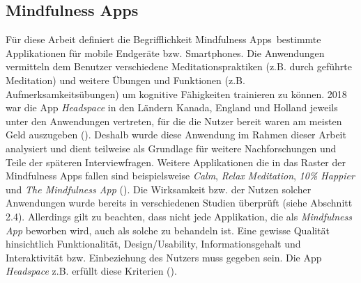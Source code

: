 \documentclass[10pt]{article}
\newcommand{\zit}[1]{(\cite{#1})}
\begin{document}
\subsection{Mindfulness Apps}
Für diese Arbeit definiert die Begrifflichkeit  \grqq Mindfulness Apps\grqq\ bestimmte Applikationen für mobile Endgeräte bzw. Smartphones. Die Anwendungen vermitteln dem Benutzer verschiedene Meditationspraktiken (z.B. durch geführte Meditation) und weitere Übungen und Funktionen (z.B. Aufmerksamkeitsübungen) um kognitive Fähigkeiten trainieren zu können. 2018 war die App \textit{Headspace} in den Ländern Kanada, England und Holland jeweils unter den Anwendungen vertreten, für die die Nutzer bereit waren am meisten Geld auszugeben \zit{SteigendeNutzung}. Deshalb wurde diese Anwendung im Rahmen dieser Arbeit analysiert und dient teilweise als Grundlage für weitere Nachforschungen und Teile der späteren Interviewfragen. 
Weitere Applikationen die in das Raster der Mindfulness Apps fallen sind beispielsweise \textit{Calm}, \textit{Relax} \textit{Meditation}, \textit{10\% Happier} und\textit{ The Mindfulness App }\zit{VergleichApps}. Die Wirksamkeit bzw. der Nutzen solcher Anwendungen wurde bereits in verschiedenen Studien überprüft (siehe Abschnitt 2.4). Allerdings gilt zu beachten, dass nicht jede Applikation, die als \textit{Mindfulness App} beworben wird, auch als solche zu behandeln ist. Eine gewisse Qualität hinsichtlich Funktionalität, Design/Usability, Informationsgehalt und Interaktivität bzw. Einbeziehung des Nutzers muss gegeben sein. Die App \textit{Headspace} z.B. erfüllt diese Kriterien \zit{KriterienApp}. 
\end{document}
